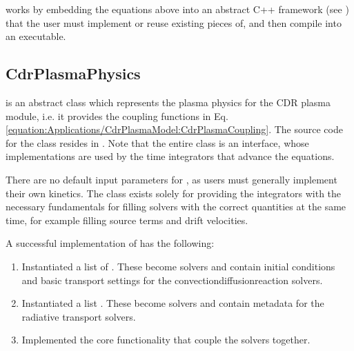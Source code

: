 \documentclass[letterpaper,10pt,english]{sphinxmanual}
\begin{document}
 works by embedding the equations above into an abstract C++ framework (see {\hyperref[\detokenize{Applications/CdrPlasmaModel:chap-cdrplasmaphysics}]{}}) that the user must implement or reuse existing pieces of, and then compile into an executable.


\subsection{CdrPlasmaPhysics}
\label{\detokenize{Applications/CdrPlasmaModel:cdrplasmaphysics}}\label{\detokenize{Applications/CdrPlasmaModel:chap-cdrplasmaphysics}}
{\hyperref[\detokenize{Applications/CdrPlasmaModel:chap-cdrplasmaphysics}]{}} is an abstract class which represents the plasma physics for the CDR plasma module, i.e. it provides the coupling functions in Eq. \ref{equation:Applications/CdrPlasmaModel:CdrPlasmaCoupling}.
The source code for the class resides in .
Note that the entire class is an interface, whose implementations are used by the time integrators that advance the equations.

There are no default input parameters for {\hyperref[\detokenize{Applications/CdrPlasmaModel:chap-cdrplasmaphysics}]{}}, as users must generally implement their own kinetics.
The class exists solely for providing the integrators with the necessary fundamentals for filling solvers with the correct quantities at the same time, for example filling source terms and drift velocities.

A successful implementation of {\hyperref[\detokenize{Applications/CdrPlasmaModel:chap-cdrplasmaphysics}]{}} has the following:
\begin{enumerate}
%
\item {} 
Instantiated a list of {\hyperref[\detokenize{Solvers/CDR:chap-cdrspecies}]{}}.
These become {\hyperref[\detokenize{Solvers/CDR:chap-cdr}]{}} solvers and contain initial conditions and basic transport settings for the convection\sphinxhyphen{}diffusion\sphinxhyphen{}reaction solvers.

\item {} 
Instantiated a list {\hyperref[\detokenize{Solvers/RTE:chap-rtspecies}]{}}.
These become {\hyperref[\detokenize{Solvers/RTE:chap-radiativetransfer}]{}} solvers and contain metadata for the radiative transport solvers.

\item {} 
Implemented the core functionality that couple the solvers together.

\end{enumerate}
\end{document}
